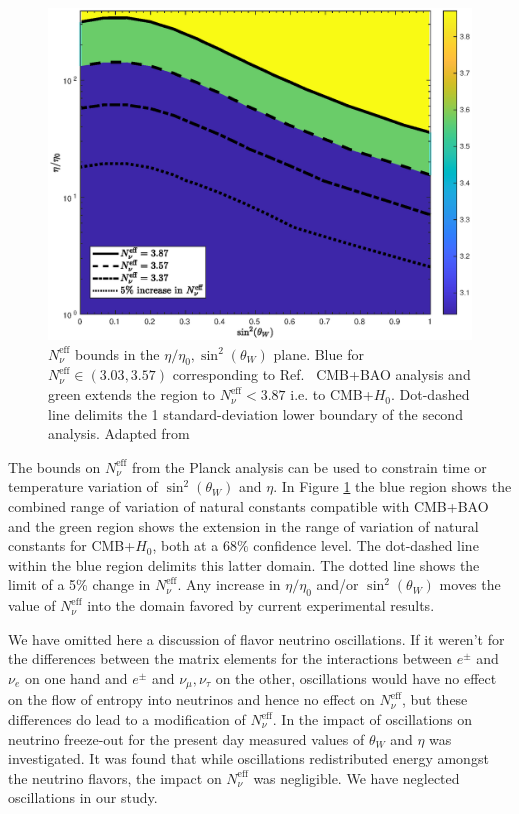 \begin{figure}
\centerline{\includegraphics[width=0.9\columnwidth]{04-birrell/ParametricStudies/Figures/region_plot_legend.eps}
}
\caption{$N_\nu^{\mathrm{eff}}$ bounds in the $\eta/\eta_0, \sin^2(\theta_W)$ plane. Blue for $N_\nu^{\mathrm{eff}}\in (3.03,3.57)$ corresponding to Ref.~\cite{Planck:2013pxb} CMB+BAO analysis and green extends the region to $N_\nu^{\mathrm{eff}}<3.87$ i.e. to CMB+$H_0$. Dot-dashed line delimits the 1 standard-deviation lower boundary of the second analysis. Adapted from \cite{Birrell:2014uka}}
\label{N_nu_domain}
 \end{figure}

The bounds on $N_\nu^{\mathrm{eff}}$ from the Planck analysis \cite{Planck:2013pxb} can be  used to constrain time or temperature variation of $\sin^2(\theta_W)$ and $\eta$.  
In  Figure \ref{N_nu_domain} the blue region shows the combined range of  variation of natural constants  compatible with CMB+BAO and the green region shows  the extension in the range of  variation of  natural constants for CMB+$H_0$, both at a $68\%$ confidence level. The dot-dashed line within the blue region delimits   this latter domain. The dotted line shows the limit of a 5\% change in $N_\nu^{\mathrm{eff}}$.    Any increase in  $\eta/\eta_0$ and/or $\sin^2(\theta_W)$ moves the value of $N_\nu^{\mathrm{eff}}$ into the domain favored by current experimental results.

We have omitted here a discussion of flavor neutrino oscillations. If it weren't for the differences between the matrix elements for the interactions between $e^\pm$ and $\nu_e$ on one hand and $e^\pm$ and $\nu_\mu,\nu_\tau$ on the other, oscillations would have no effect on the flow of entropy into neutrinos and hence no effect on $N_\nu^{\mathrm{eff}}$, but these differences do lead to a modification of $N_\nu^{\mathrm{eff}}$.  In \cite{Mangano:2005cc} the impact of oscillations on neutrino freeze-out for the present day measured values of $\theta_W$ and $\eta$ was investigated.  It was found  that while oscillations redistributed energy amongst the neutrino flavors, the impact on $N_\nu^{\mathrm{eff}}$ was negligible. We have neglected oscillations in our study.

